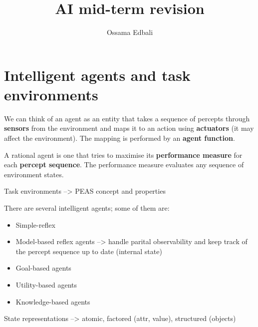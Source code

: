 \documentclass[a4paper, 11pt]{article}
\author{Ossama Edbali}
\title{AI mid-term revision}
\begin{document}
\maketitle


\section{Intelligent agents and task environments}
We can think of an agent as an entity that takes a sequence of percepts through \textbf{sensors} from the environment and maps it to an action using \textbf{actuators} (it may affect the environment). The mapping is performed by an \textbf{agent function}.

A rational agent is one that tries to maximise its \textbf{performance measure} for each \textbf{percept sequence}. The performance measure evaluates any sequence of environment states.

Task environments --> PEAS concept and properties

There are several intelligent agents; some of them are:
\begin{itemize}
  \item Simple-reflex
  \item Model-based reflex agents --> handle parital observability and keep track of the percept sequence up to date (internal state)
  \item Goal-based agents
  \item Utility-based agents
  \item Knowledge-based agents
\end{itemize}

State representations --> atomic, factored (attr, value), structured (objects)
\end{document}
